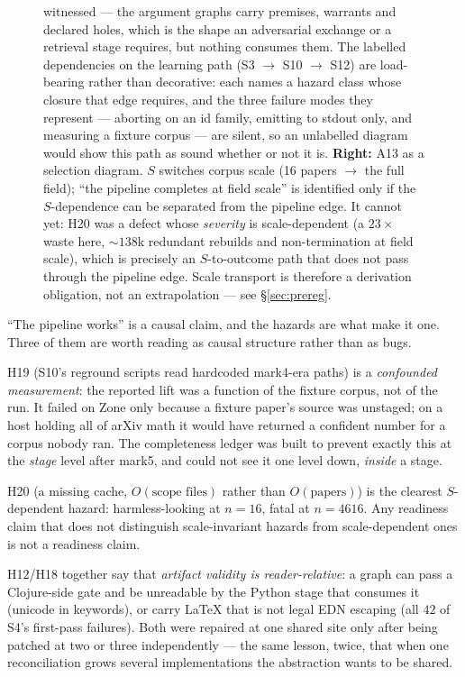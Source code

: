 \documentclass[11pt]{article}
\newcommand{\hz}[1]{\textsf{#1}}
\begin{document}
\begin{figure}[t]
{{witnessed} --- the argument graphs carry premises, warrants and declared holes,
which is the shape an adversarial exchange or a retrieval stage requires, but
nothing consumes them. The labelled dependencies on the learning path
(S3 $\to$ S10 $\to$ S12) are load-bearing rather than decorative: each names a
hazard class whose closure that edge requires, and the three failure modes they
represent --- aborting on an id family, emitting to stdout only, and measuring a
fixture corpus --- are silent, so an unlabelled diagram would show this path as
sound whether or not it is.
\textbf{Right:} A13 as a selection diagram. $S$ switches corpus scale (16
papers $\to$ the full field); ``the pipeline completes at field scale'' is
identified only if the $S$-dependence can be separated from the pipeline edge.
It cannot yet: \hz{H20} was a defect whose \emph{severity} is scale-dependent (a
$23\times$ waste here, ${\sim}138$k redundant rebuilds and non-termination at
field scale), which is precisely an $S$-to-outcome path that does not pass
through the pipeline edge. Scale transport is therefore a derivation
obligation, not an extrapolation --- see \S\ref{sec:prereg}.}
\label{fig:dag}
\end{figure}

``The pipeline works'' is a causal claim, and the hazards are what make it one.
Three of them are worth reading as causal structure rather than as bugs.

\hz{H19} (S10's reground scripts read hardcoded mark4-era paths) is a
\emph{confounded measurement}: the reported lift was a function of the fixture
corpus, not of the run. It failed on Zone only because a fixture paper's
source was unstaged; on a host holding all of arXiv math it would have returned
a confident number for a corpus nobody ran. The completeness ledger was built
to prevent exactly this at the \emph{stage} level after mark5, and could not
see it one level down, \emph{inside} a stage.

\hz{H20} (a missing cache, $O(\text{scope files})$ rather than
$O(\text{papers})$) is the clearest $S$-dependent hazard: harmless-looking at
$n{=}16$, fatal at $n{=}4616$. Any readiness claim that does not distinguish
scale-invariant hazards from scale-dependent ones is not a readiness claim.

\hz{H12}/\hz{H18} together say that \emph{artifact validity is
reader-relative}: a graph can pass a Clojure-side gate and be unreadable by the
Python stage that consumes it (unicode in keywords), or carry \LaTeX{} that is
not legal EDN escaping (all $42$ of S4's first-pass failures). Both were
repaired at one shared site only after being patched at two or three
independently --- the same lesson, twice, that when one reconciliation grows
several implementations the abstraction wants to be shared.
\end{document}
